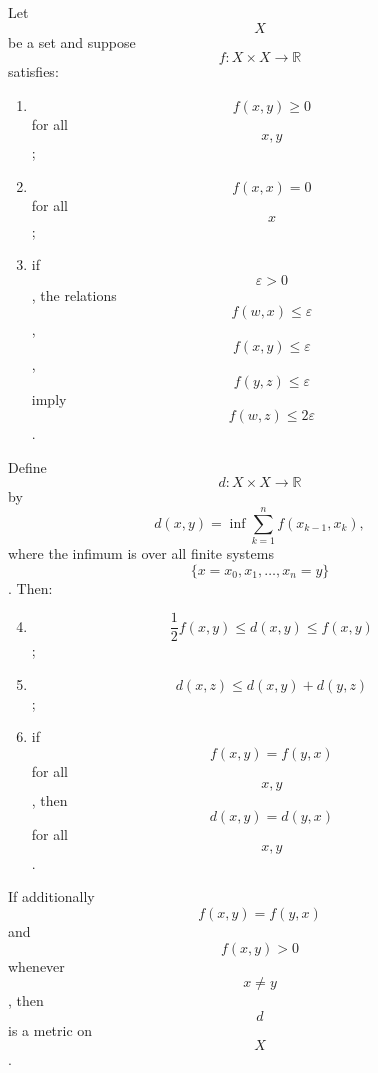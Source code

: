 Let $$X$$ be a set and suppose $$f: X \times X \to \mathbb{R}$$ satisfies:
\begin{enumerate}
\item $$f(x, y) \geq 0$$ for all $$x, y$$;
\item $$f(x, x) = 0$$ for all $$x$$;
\item if $$\varepsilon > 0$$, the relations $$f(w, x) \leq \varepsilon$$, $$f(x, y) \leq \varepsilon$$, $$f(y, z) \leq \varepsilon$$ imply $$f(w, z) \leq 2\varepsilon$$.
\end{enumerate}
Define $$d: X \times X \to \mathbb{R}$$ by
$$d(x, y) = \inf \sum_{k=1}^n f(x_{k-1}, x_k),$$
where the infimum is over all finite systems $$\{x = x_0, x_1, \ldots, x_n = y\}$$. Then:
\begin{enumerate}
\setcounter{enumi}{3}
\item $$\frac{1}{2} f(x, y) \leq d(x, y) \leq f(x, y)$$;
\item $$d(x, z) \leq d(x, y) + d(y, z)$$;
\item if $$f(x, y) = f(y, x)$$ for all $$x, y$$, then $$d(x, y) = d(y, x)$$ for all $$x, y$$.
\end{enumerate}
If additionally $$f(x, y) = f(y, x)$$ and $$f(x, y) > 0$$ whenever $$x \neq y$$, then $$d$$ is a metric on $$X$$.
